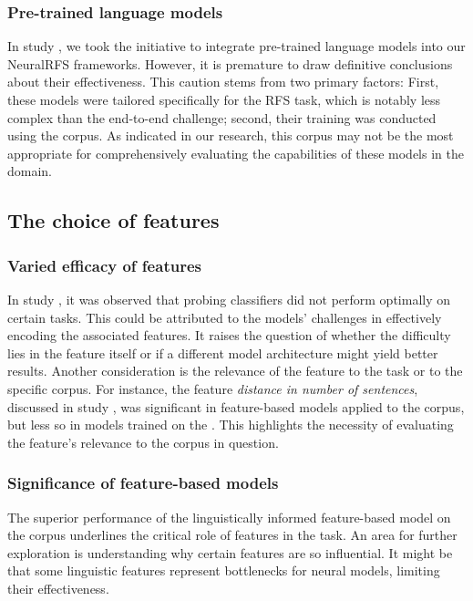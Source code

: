 \subsubsection{Pre-trained language models}
In study \studG, we took the initiative to integrate pre-trained language models into our NeuralRFS frameworks. However, it is premature to draw definitive conclusions about their effectiveness. This caution stems from two primary factors: First, these models were tailored specifically for the RFS task, which is notably less complex than the end-to-end \context challenge; second, their training was conducted using the \webnlg corpus. As indicated in our research, this corpus may not be the most appropriate for comprehensively evaluating the capabilities of these models in the \context domain.



\subsection{The choice of features}
\subsubsection{Varied efficacy of features}
In study \studG, it was observed that probing classifiers did not perform optimally on certain tasks. This could be attributed to the models' challenges in effectively encoding the associated features. It raises the question of whether the difficulty lies in the feature itself or if a different model architecture might yield better results. Another consideration is the relevance of the feature to the task or to the specific corpus. For instance, the feature \textit{distance in number of sentences}, discussed in study \studC, was significant in feature-based models applied to the \wsj corpus, but less so in models trained on the \msrcor. This highlights the necessity of evaluating the feature's relevance to the corpus in question.
	
\subsubsection{Significance of feature-based models}
The superior performance of the linguistically informed feature-based model on the \wsj corpus underlines the critical role of features in the \context task. An area for further exploration is understanding why certain features are so influential. It might be that some linguistic features represent bottlenecks for neural models, limiting their effectiveness.
	
